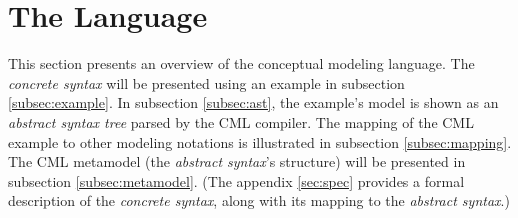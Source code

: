 \section{The Language}\label{sec:lang}
%
This section presents an overview of the conceptual modeling language.
The \emph{concrete syntax} will be presented using an example in subsection \ref{subsec:example}. 
In subsection \ref{subsec:ast},
the example's model is shown as an \emph{abstract syntax tree} parsed by the CML compiler.
The mapping of the CML example to other modeling notations is illustrated in subsection \ref{subsec:mapping}.
The CML metamodel (the \emph{abstract syntax}'s structure) will be presented in subsection \ref{subsec:metamodel}. 
(The appendix \ref{sec:spec} provides a formal description of the \emph{concrete syntax},
along with its mapping to the \emph{abstract syntax}.)






